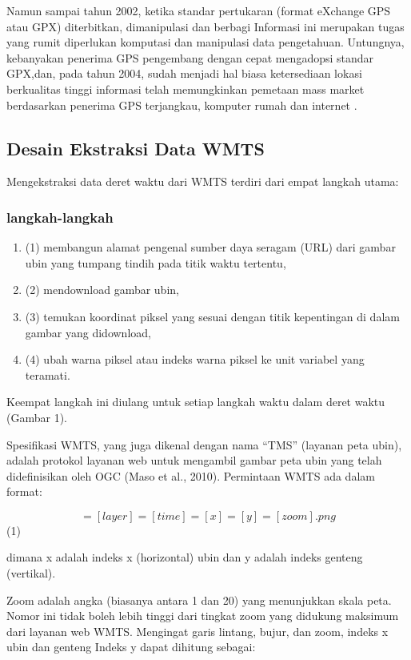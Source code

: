 Namun sampai tahun 2002, ketika standar pertukaran (format eXchange GPS atau GPX) diterbitkan, dimanipulasi dan berbagi Informasi ini
merupakan tugas yang rumit diperlukan komputasi dan manipulasi data pengetahuan. Untungnya, kebanyakan penerima GPS pengembang dengan
cepat mengadopsi standar GPX,dan, pada tahun 2004, sudah menjadi hal biasa ketersediaan lokasi berkualitas tinggi informasi telah
memungkinkan pemetaan mass market berdasarkan penerima GPS terjangkau, komputer rumah dan internet \cite{haklay2008openstreetmap}. 


\subsection{Desain Ekstraksi Data WMTS}
Mengekstraksi data deret waktu dari WMTS terdiri dari empat langkah utama:
\subsubsection{langkah-langkah}
\begin{enumerate}
	\item (1) membangun alamat pengenal sumber daya seragam (URL) dari gambar ubin yang tumpang tindih pada titik waktu tertentu, 
	\item (2) mendownload gambar ubin, 
	\item (3) temukan koordinat piksel yang sesuai dengan titik kepentingan di dalam gambar yang didownload,
	\item (4) ubah warna piksel atau indeks warna piksel ke unit variabel yang teramati.
\end{enumerate}
Keempat langkah ini diulang untuk setiap langkah waktu dalam deret waktu (Gambar 1).

Spesifikasi WMTS, yang juga dikenal dengan nama ``TMS'' (layanan peta ubin), adalah protokol layanan web untuk mengambil gambar peta ubin yang telah
didefinisikan oleh OGC (Maso et al., 2010). Permintaan WMTS ada dalam format:

\begin{equation}
	    [server]=[layer]=[time]=[x]=[y]=[zoom].png 
\end{equation}
(1)

dimana x adalah indeks x (horizontal) ubin dan y adalah indeks genteng (vertikal).

Zoom adalah angka (biasanya antara 1 dan 20) yang menunjukkan skala peta. Nomor ini tidak boleh lebih tinggi dari tingkat zoom yang 
didukung maksimum dari layanan web WMTS. Mengingat garis lintang, bujur, dan zoom, indeks x ubin dan genteng
Indeks y dapat dihitung sebagai:

